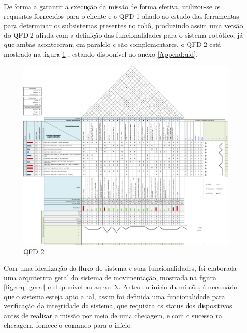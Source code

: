 De forma a garantir a execução da missão de forma efetiva, utilizou-se os requisitos fornecidos para o cliente e o QFD 1 aliado ao estudo das ferramentas para determinar os subsistemas presentes no robô, produzindo assim uma versão do QFD 2 aliada com a definição das funcionalidades para o sistema robótico, já que ambas aconteceram em paralelo e são complementares, o QFD 2 está mostrado na figura \ref{fig:qfd2} , estando disponível no anexo \ref{Append:qfd}.

\begin{figure}[H]
	\centering
	\includegraphics[scale=1]{Figures/qfdelir-2.png}
	\caption{QFD 2}
	\label{fig:qfd2}
\end{figure}

Com uma idealização do fluxo do sistema e suas funcionalidades, foi elaborada uma arquitetura geral do sistema de movimentação, mostrada na figura \ref{fig:arq_geral} e disponível no anexo X.  Antes do início da missão, é necessário que o sistema esteja apto a tal, assim foi definida uma funcionalidade para verificação da integridade do sistema, que requisita os status dos dispositivos antes de realizar a missão por meio de uma checagem, e com o sucesso na checagem, fornece o comando para o início.

